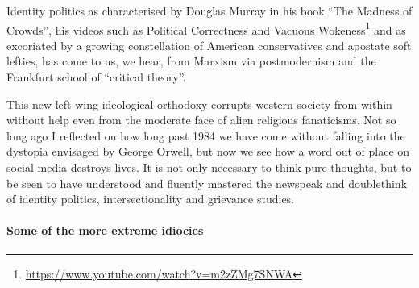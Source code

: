 \documentclass[14pt,titlepage]{extarticle}
\newcommand{\hreg}[2]{\href{#1}{#2}\footnote{\url{#1}}}
\begin{document}
Identity politics as characterised by Douglas Murray in his book ``The Madness of Crowds'', his videos such as \hreg{https://www.youtube.com/watch?v=m2zZMg7SNWA}{Political Correctness and Vacuous Wokeness} and as excoriated by a growing constellation of American conservatives and apostate soft lefties, has come to us, we hear, from Marxism via postmodernism and the Frankfurt school of ``critical theory''.

This new left wing ideological orthodoxy corrupts western society from within without help even from the moderate face of alien religious fanaticisms.
Not so long ago I reflected on how long past 1984 we have come without falling into the dystopia envisaged by George Orwell, but now we see how a word out of place on social media destroys lives.
It is not only necessary to think pure thoughts, but to be seen to have understood and fluently mastered the newspeak and doublethink of identity politics, intersectionality and grievance studies.

\paragraph{Some of the more extreme idiocies}
\end{document}
